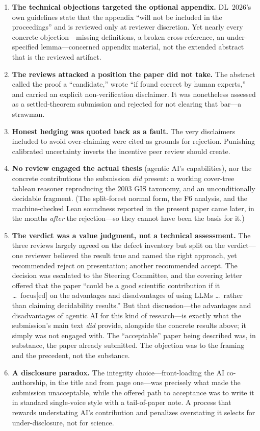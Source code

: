 \documentclass[11pt]{article}
\theoremstyle{plain}
\theoremstyle{definition}
\begin{document}
\begin{enumerate}
  \item \textbf{The technical objections targeted the optional appendix.}
    DL~2026's own guidelines state that the appendix ``will not be
    included in the proceedings'' and is reviewed only at reviewer
    discretion. Yet nearly every concrete objection---missing
    definitions, a broken cross-reference, an under-specified
    lemma---concerned appendix material, not the extended abstract that is
    the reviewed artifact.
  \item \textbf{The reviews attacked a position the paper did not take.}
    The abstract called the proof a ``candidate,'' wrote ``if found
    correct by human experts,'' and carried an explicit non-verification
    disclaimer. It was nonetheless assessed as a settled-theorem
    submission and rejected for not clearing that bar---a strawman.
  \item \textbf{Honest hedging was quoted back as a fault.} The very
    disclaimers included to avoid over-claiming were cited as grounds for
    rejection. Punishing calibrated uncertainty inverts the incentive peer
    review should create.
  \item \textbf{No review engaged the actual thesis} (agentic AI's
    capabilities), nor the concrete contributions the submission
    \emph{did} present: a working cover-tree tableau reasoner reproducing
    the $2003$ GIS taxonomy, and an unconditionally decidable fragment.
    (The split-forest normal form, the F6 analysis, and
    the machine-checked Lean soundness reported in the present paper came
    later, in the months \emph{after} the rejection---so they cannot have
    been the basis for it.)
  \item \textbf{The verdict was a value judgment, not a technical
    assessment.} The three reviews largely agreed on the defect inventory
    but split on the verdict---one reviewer believed the result true and
    named the right approach, yet recommended reject on presentation;
    another recommended accept. The decision was escalated to the Steering
    Committee, and the covering letter offered that the paper ``could be a
    good scientific contribution if it \dots\ focus[ed] on the advantages
    and disadvantages of using LLMs \dots\ rather than claiming
    decidability results.'' But that discussion---the advantages and
    disadvantages of agentic AI for this kind of research---is exactly what
    the submission's main text \emph{did} provide, alongside the concrete
    results above; it simply was not engaged with. The ``acceptable''
    paper being described was, in substance, the paper already submitted.
    The objection was to the framing and the precedent, not the substance.
  \item \textbf{A disclosure paradox.} The integrity choice---front-loading
    the AI co-authorship, in the title and from page one---was precisely
    what made the submission unacceptable, while the offered path to
    acceptance was to write it in standard single-voice style with a
    tail-of-paper note. A process that rewards understating AI's
    contribution and penalizes overstating it selects for
    under-disclosure, not for science.
\end{enumerate}
\end{document}
